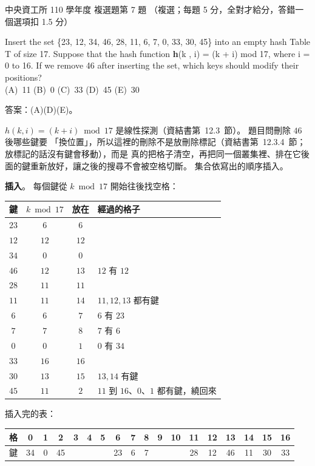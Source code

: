 \begin{pastexam}[label={px:ncu-110-dsa-07}]{中央資工所 110 學年度 複選題第 7 題}
（複選；每題 5 分，全對才給分，答錯一個選項扣 1.5 分）

Insert the set \{23, 12, 34, 46, 28, 11, 6, 7, 0, 33, 30, 45\} into an empty hash Table T of size
17. Suppose that the hash function \textbf{h}(k , i) = (k + i) mod 17, where i = 0 to 16. If we
remove 46 after inserting the set, which keys should modify their positions?\\
(A)~11 \quad (B)~0 \quad (C)~33 \quad (D)~45 \quad (E)~30
\end{pastexam}

\begin{pastsoln}
答案：(A)(D)(E)。

$h(k, i) = (k + i) \bmod 17$ 是線性探測（資結書第~12.3~節）。 題目問刪除 $46$ 後哪些鍵要
「換位置」，所以這裡的刪除不是放刪除標記（資結書第~12.3.4~節；放標記的話沒有鍵會移動），而是
真的把格子清空，再把同一個叢集裡、排在它後面的鍵重新放好，讓之後的搜尋不會被空格切斷。
集合依寫出的順序插入。

\textbf{插入}。 每個鍵從 $k \bmod 17$ 開始往後找空格：
\begin{center}
\small
\begin{tabular}{cccl}
\toprule
鍵 & $k \bmod 17$ & 放在 & 經過的格子 \\
\midrule
$23$ & $6$ & $6$ & \\
$12$ & $12$ & $12$ & \\
$34$ & $0$ & $0$ & \\
$46$ & $12$ & $13$ & $12$ 有 $12$ \\
$28$ & $11$ & $11$ & \\
$11$ & $11$ & $14$ & $11, 12, 13$ 都有鍵 \\
$6$ & $6$ & $7$ & $6$ 有 $23$ \\
$7$ & $7$ & $8$ & $7$ 有 $6$ \\
$0$ & $0$ & $1$ & $0$ 有 $34$ \\
$33$ & $16$ & $16$ & \\
$30$ & $13$ & $15$ & $13, 14$ 有鍵 \\
$45$ & $11$ & $2$ & $11$ 到 $16$、$0$、$1$ 都有鍵，繞回來 \\
\bottomrule
\end{tabular}
\end{center}
插入完的表：
\begin{center}
\small
\setlength{\tabcolsep}{3.5pt}
\begin{tabular}{l*{17}{c}}
\toprule
格 & 0 & 1 & 2 & 3 & 4 & 5 & 6 & 7 & 8 & 9 & 10 & 11 & 12 & 13 & 14 & 15 & 16 \\
\midrule
鍵 & 34 & 0 & 45 & & & & 23 & 6 & 7 & & & 28 & 12 & 46 & 11 & 30 & 33 \\
\bottomrule
\end{tabular}
\end{center}


\end{pastsoln}
